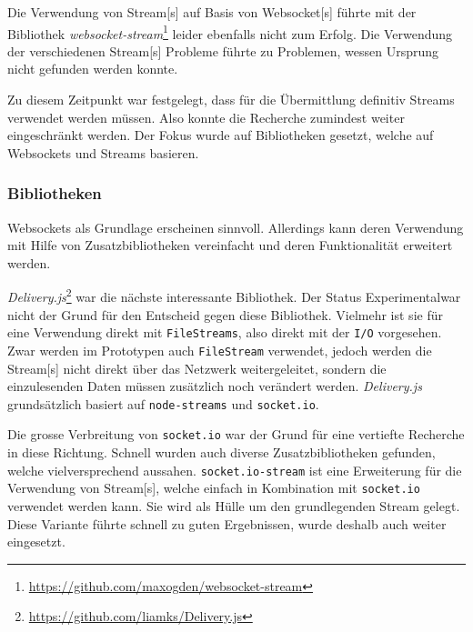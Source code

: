 Die Verwendung von \gls{Stream}[s] auf Basis von \gls{Websocket}[s] führ\-te mit der Bi\-blio\-thek \textit{websocket-stream}\footnote{\url{https://github.com/maxogden/websocket-stream}} leider ebenfalls nicht zum Erfolg. Die Verwendung der verschiedenen \gls{Stream}[s] Probleme führte zu Problemen, wessen Ursprung nicht gefunden werden konnte.

Zu diesem Zeitpunkt war festgelegt, dass für die Übermittlung definitiv Streams verwendet werden müssen. Also konnte die Recherche zumindest weiter eingeschränkt werden. Der Fokus wurde auf Bibliotheken gesetzt, welche auf Websockets und Streams basieren.



\subsubsection{Bibliotheken}



Websockets als Grundlage erscheinen sinnvoll. Allerdings kann deren Verwendung mit Hilfe von Zusatzbibliotheken vereinfacht und deren Funktionalität erweitert werden.

\textit{Delivery.js}\footnote{\url{https://github.com/liamks/Delivery.js}} war die nächste interessante Bibliothek. Der Status \glqq Experimental\grqq war nicht der Grund für den Entscheid gegen diese Bibliothek. Vielmehr ist sie für eine Verwendung direkt mit \texttt{FileStreams}, also direkt mit der \texttt{I/O} vorgesehen. Zwar werden im Prototypen auch \texttt{FileStream} verwendet, jedoch werden die \gls{Stream}[s] nicht direkt über das Netzwerk weitergeleitet, sondern die einzulesenden Daten müs\-sen zusätzlich noch verändert werden. \textit{Delivery.js} grundsätzlich basiert auf \texttt{no\-de-stre\-ams} und \texttt{socket.io}.

Die grosse Verbreitung von \texttt{socket.io} war der Grund für eine vertiefte Recherche in diese Richtung. Schnell wurden auch diverse Zusatzbibliotheken gefunden, welche vielversprechend aussahen. \texttt{so\-cket.\-io-\-stre\-am} ist eine Erweiterung für die Verwendung von \gls{Stream}[s], welche einfach in Kombination mit \texttt{socket.io} verwendet werden kann. Sie wird als Hülle um den grundlegenden Stream gelegt. Diese Variante führte schnell zu guten Ergebnissen, wurde deshalb auch weiter eingesetzt.



